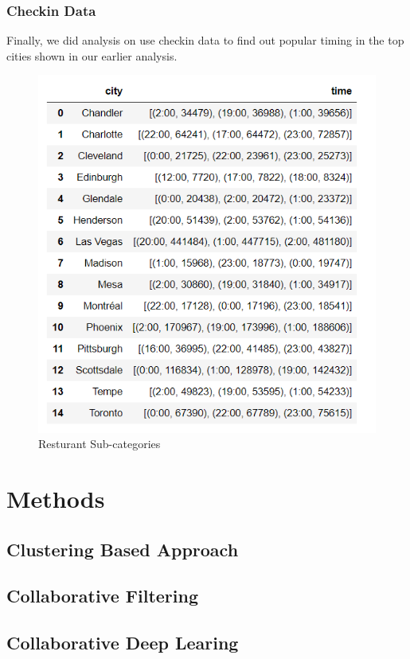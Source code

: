 \documentclass[11pt]{article}
\begin{document}
 	\subsubsection{Checkin Data}
 	Finally, we did analysis on use checkin data to find out popular timing in the top cities shown in our earlier analysis.
 
 	\begin{figure}[h]
 		\centering
 		\includegraphics[scale=0.5] {checkin_times.png}
 		\caption{Resturant Sub-categories}
 	\end{figure}
	\section{Methods}
		
		\subsection{Clustering Based Approach}
		
		\subsection{Collaborative Filtering}
		
		\subsection{Collaborative Deep Learing}
		
\end{document}
